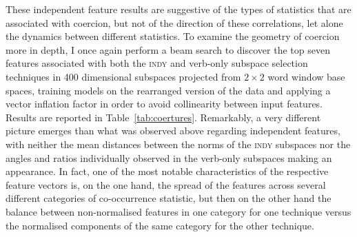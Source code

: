 These independent feature results are suggestive of the types of statistics that are associated with coercion, but not of the direction of these correlations, let alone the dynamics between different statistics.  To examine the geometry of coercion more in depth, I once again perform a beam search to discover the top seven features associated with both the \textsc{indy} and verb-only subspace selection techniques in 400 dimensional subspaces projected from $2 \times 2$ word window base spaces, training models on the rearranged version of the data and applying a vector inflation factor in order to avoid collinearity between input features.  Results are reported in Table~\ref{tab:coertures}.  Remarkably, a very different picture emerges than what was observed above regarding independent features, with neither the mean distances between the norms of the \textsc{indy} subspaces nor the angles and ratios individually observed in the verb-only subspaces making an appearance.  In fact, one of the most notable characteristics of the respective feature vectors is, on the one hand, the spread of the features across several different categories of co-occurrence statistic, but then on the other hand the balance between non-normalised features in one category for one technique versus the normalised components of the same category for the other technique.


